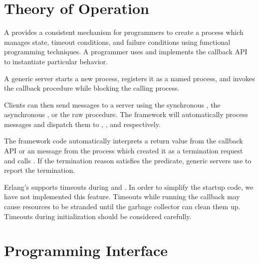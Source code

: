 \section {Theory of Operation}

A  provides a consistent mechanism for programmers
to create a process which manages state, timeout conditions, and
failure conditions using functional programming techniques. A
programmer uses  and implements the callback
API to instantiate particular behavior.

A generic server starts a new process, registers it as a named
process, and invokes the  callback procedure while
blocking the calling process.

Clients can then send messages to a server using the synchronous
, the asynchronous ,
or the raw  procedure. The  framework
will automatically process messages and dispatch them to
, , and 
respectively.

The  framework code automatically interprets a
 return value from the callback API or an 
message from the process which created it as a termination request and
calls . If the termination reason satisfies the
 predicate, generic servers use
 to report the termination.

Erlang's  supports timeouts during
 and . In
order to simplify the startup code, we have not implemented this
feature. Timeouts while running the  callback may cause
resources to be stranded until the garbage collector can clean them
up. Timeouts during initialization should be considered carefully.

\section {Programming Interface}

\begin{syntax}
\end{syntax}
\returns{}

\begin{argtbl}
\end{argtbl}

